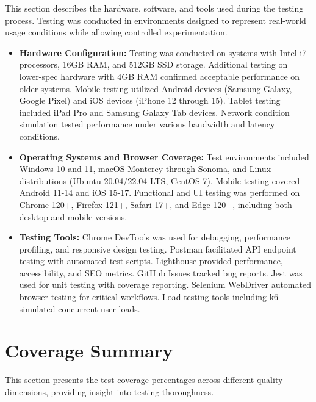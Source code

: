 \justifying
\noindent This section describes the hardware, software, and tools used during the testing process. Testing was conducted in environments designed to represent real-world usage conditions while allowing controlled experimentation.

\begin{itemize}
    \item \textbf{Hardware Configuration:} Testing was conducted on systems with Intel i7 processors, 16GB RAM, and 512GB SSD storage. Additional testing on lower-spec hardware with 4GB RAM confirmed acceptable performance on older systems. Mobile testing utilized Android devices (Samsung Galaxy, Google Pixel) and iOS devices (iPhone 12 through 15). Tablet testing included iPad Pro and Samsung Galaxy Tab devices. Network condition simulation tested performance under various bandwidth and latency conditions.

    \item \textbf{Operating Systems and Browser Coverage:} Test environments included Windows 10 and 11, macOS Monterey through Sonoma, and Linux distributions (Ubuntu 20.04/22.04 LTS, CentOS 7). Mobile testing covered Android 11-14 and iOS 15-17. Functional and UI testing was performed on Chrome 120+, Firefox 121+, Safari 17+, and Edge 120+, including both desktop and mobile versions.

    \item \textbf{Testing Tools:} Chrome DevTools was used for debugging, performance profiling, and responsive design testing. Postman facilitated API endpoint testing with automated test scripts. Lighthouse provided performance, accessibility, and SEO metrics. GitHub Issues tracked bug reports. Jest was used for unit testing with coverage reporting. Selenium WebDriver automated browser testing for critical workflows. Load testing tools including k6 simulated concurrent user loads.
\end{itemize}

\section{Coverage Summary}

\justifying
\noindent This section presents the test coverage percentages across different quality dimensions, providing insight into testing thoroughness.

